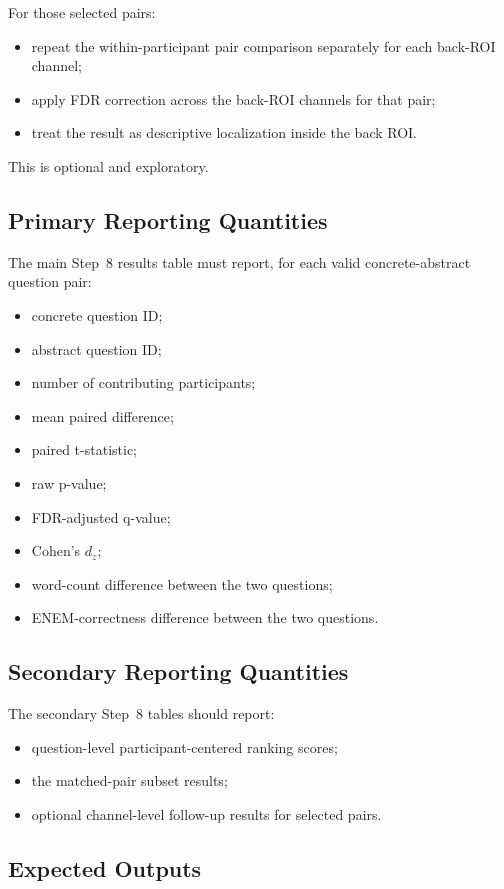 \documentclass[11pt]{article}
\begin{document}
For those selected pairs:
\begin{itemize}
    \item repeat the within-participant pair comparison separately for each back-ROI channel;
    \item apply FDR correction across the back-ROI channels for that pair;
    \item treat the result as descriptive localization inside the back ROI.
\end{itemize}

This is optional and exploratory.

\subsection{Primary Reporting Quantities}
The main Step~8 results table must report, for each valid concrete-abstract question pair:
\begin{itemize}
    \item concrete question ID;
    \item abstract question ID;
    \item number of contributing participants;
    \item mean paired difference;
    \item paired t-statistic;
    \item raw p-value;
    \item FDR-adjusted q-value;
    \item Cohen's \(d_z\);
    \item word-count difference between the two questions;
    \item ENEM-correctness difference between the two questions.
\end{itemize}

\subsection{Secondary Reporting Quantities}
The secondary Step~8 tables should report:
\begin{itemize}
    \item question-level participant-centered ranking scores;
    \item the matched-pair subset results;
    \item optional channel-level follow-up results for selected pairs.
\end{itemize}

\subsection{Expected Outputs}
\end{document}
